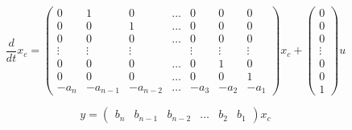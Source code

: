         \begin{equation}
            \frac{d}{dt} x_c =
            \begin{pmatrix}
            0 & 1 & 0 & \dots & 0 & 0 & 0 \\
            0 & 0 & 1 & \dots & 0 & 0 & 0 \\
            0 & 0 & 0 & \dots & 0 & 0 & 0 \\
            \vdots & \vdots & \vdots & & \vdots & \vdots & \vdots \\
            0 & 0 & 0 & \dots & 0 & 1 & 0 \\
            0 & 0 & 0 & \dots & 0 & 0 & 1 \\
            -a_{n} & -a_{n-1} & -a_{n-2} & \dots & -a_{3} & -a_{2} & -a_{1}
            \end{pmatrix} x_c +
            \begin{pmatrix}
            0 \\
            0 \\
            0 \\
            \vdots \\
            0 \\
            0 \\
            1
            \end{pmatrix} u
        \end{equation}

        \begin{equation}
            y =
            \begin{pmatrix}
                b_n & b_{n-1} & b_{n-2} & \dots & b_2 & b_1
            \end{pmatrix} x_c
        \end{equation}

